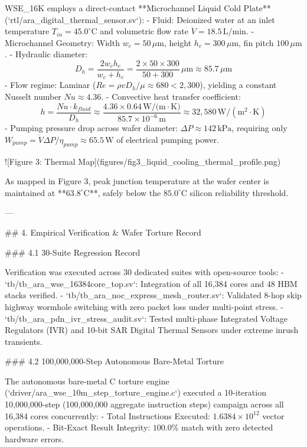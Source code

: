 \documentclass[journal,10pt,twocolumn]{IEEEtran}
\begin{document}
WSE_16K employs a direct-contact **Microchannel Liquid Cold Plate** (`rtl/ara_digital_thermal_sensor.sv`):
- Fluid: Deionized water at an inlet temperature $T_{in} = 45.0^\circ\text{C}$ and volumetric flow rate $\dot{V} = 18.5\,\text{L/min}$.
- Microchannel Geometry: Width $w_c = 50\,\mu\text{m}$, height $h_c = 300\,\mu\text{m}$, fin pitch $100\,\mu\text{m}$.
- Hydraulic diameter:
$$D_h = \frac{2 w_c h_c}{w_c + h_c} = \frac{2 \times 50 \times 300}{50 + 300}\,\mu\text{m} \approx 85.7\,\mu\text{m}$$
- Flow regime: Laminar ($Re = \rho v D_h / \mu \approx 680 < 2,300$), yielding a constant Nusselt number $Nu \approx 4.36$.
- Convective heat transfer coefficient:
$$h = \frac{Nu \cdot k_{fluid}}{D_h} \approx \frac{4.36 \times 0.64\,\text{W/(m}\cdot\text{K)}}{85.7 \times 10^{-6}\,\text{m}} \approx 32,580\,\text{W}/(\text{m}^2 \cdot \text{K})$$
- Pumping pressure drop across wafer diameter: $\Delta P \approx 142\,\text{kPa}$, requiring only $W_{pump} = \dot{V} \Delta P / \eta_{pump} \approx 65.5\,\text{W}$ of electrical pumping power.

![Figure 3: Thermal Map](figures/fig3_liquid_cooling_thermal_profile.png)

As mapped in Figure 3, peak junction temperature at the wafer center is maintained at **$63.8^\circ\text{C}$**, safely below the $85.0^\circ\text{C}$ silicon reliability threshold.

---

## 4. Empirical Verification & Wafer Torture Record

### 4.1 30-Suite Regression Record

Verification was executed across 30 dedicated suites with open-source tools:
- `tb/tb_ara_wse_16384core_top.sv`: Integration of all 16,384 cores and 48 HBM stacks verified.
- `tb/tb_ara_noc_express_mesh_router.sv`: Validated 8-hop skip highway wormhole switching with zero packet loss under multi-point stress.
- `tb/tb_ara_pdn_ivr_stress_audit.sv`: Tested multi-phase Integrated Voltage Regulators (IVR) and 10-bit SAR Digital Thermal Sensors under extreme inrush transients.

### 4.2 100,000,000-Step Autonomous Bare-Metal Torture

The autonomous bare-metal C torture engine (`driver/ara_wse_10m_step_torture_engine.c`) executed a 10-iteration 10,000,000-step (100,000,000 aggregate instruction steps) campaign across all 16,384 cores concurrently:
- Total Instructions Executed: $1.6384 \times 10^{12}$ vector operations.
- Bit-Exact Result Integrity: $100.0\%$ match with zero detected hardware errors.
\end{document}
